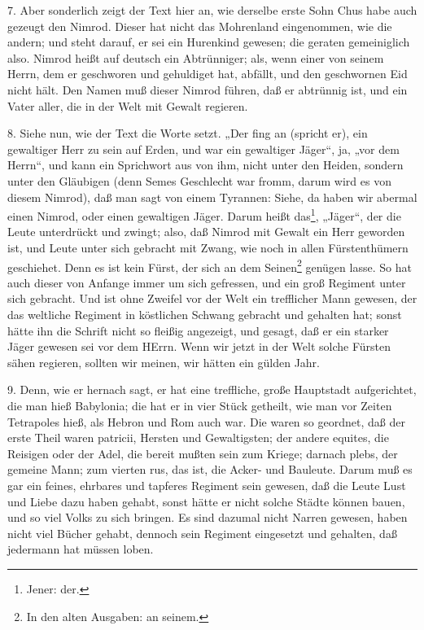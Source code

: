 7. Aber sonderlich zeigt der Text hier an, wie derselbe erste Sohn Chus habe auch gezeugt den Nimrod. Dieser hat nicht das Mohrenland eingenommen, wie die andern; und steht darauf, er sei ein Hurenkind gewesen; die geraten gemeiniglich also. Nimrod heißt auf deutsch ein Abtrünniger; als, wenn einer von seinem Herrn, dem er geschworen und gehuldiget hat, abfällt, und den geschwornen Eid nicht hält. Den Namen muß dieser Nimrod führen, daß er abtrünnig ist, und ein Vater aller, die in der Welt mit Gewalt regieren.

8. Siehe nun, wie der Text die Worte setzt. „Der fing an (spricht er), ein gewaltiger Herr zu sein auf Erden, und war ein gewaltiger Jäger“, ja, „vor dem Herrn“, und kann ein Sprichwort aus von ihm, nicht unter den Heiden, sondern unter den Gläubigen (denn Semes Geschlecht war fromm, darum wird es von diesem Nimrod), daß man sagt von einem Tyrannen: Siehe, da haben wir abermal einen Nimrod, oder einen gewaltigen Jäger. Darum heißt das\footnote{Jener: der.}, „Jäger“, der die Leute unterdrückt und zwingt; also, daß Nimrod mit Gewalt ein Herr geworden ist, und Leute unter sich gebracht mit Zwang, wie noch in allen Fürstenthümern geschiehet. Denn es ist kein Fürst, der sich an dem Seinen\footnote{In den alten Ausgaben: an seinem.} genügen lasse. So hat auch dieser von Anfange immer um sich gefressen, und ein groß Regiment unter sich gebracht. Und ist ohne Zweifel vor der Welt ein trefflicher Mann gewesen, der das weltliche Regiment in köstlichen Schwang gebracht und gehalten hat; sonst hätte ihn die Schrift nicht so fleißig angezeigt, und gesagt, daß er ein starker Jäger gewesen sei vor dem HErrn. Wenn wir jetzt in der Welt solche Fürsten sähen regieren, sollten wir meinen, wir hätten ein gülden Jahr.

9. Denn, wie er hernach sagt, er hat eine treffliche, große Hauptstadt aufgerichtet, die man hieß Babylonia; die hat er in vier Stück getheilt, wie man vor Zeiten Tetrapoles hieß, als Hebron und Rom auch war. Die waren so geordnet, daß der erste Theil waren patricii, Hersten und Gewaltigsten; der andere equites, die Reisigen oder der Adel, die bereit mußten sein zum Kriege; darnach plebs, der gemeine Mann; zum vierten rus, das ist, die Acker- und Bauleute. Darum muß es gar ein feines, ehrbares und tapferes Regiment sein gewesen, daß die Leute Lust und Liebe dazu haben gehabt, sonst hätte er nicht solche Städte können bauen, und so viel Volks zu sich bringen. Es sind dazumal nicht Narren gewesen, haben nicht viel Bücher gehabt, dennoch sein Regiment eingesetzt und gehalten, daß jedermann hat müssen loben.

